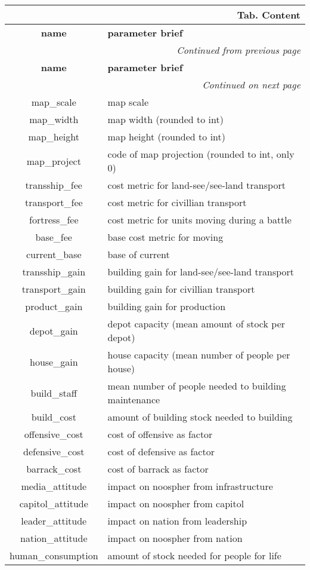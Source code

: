 \documentclass[a4paper,oneside,titlepage]{report}
\newcommand*{\LTHeaderII}[3]{
  \multicolumn{2}{r}{\textbf{Tab. \thesubsection} \textbf{#1}}\\    
  \hline
  \textbf{#2} & \textbf{#3}\\
  \hline

  \endfirsthead
  \multicolumn{2}{r}{\textit{Continued from previous page}}\\    
  \hline
  \textbf{#2} & \textbf{#3}\\
  \hline
  \endhead
  \hline
  \multicolumn{2}{r}{\textit{Continued on next page}}\\
  \endfoot
  \hline
  \endlastfoot  
}
\begin{document}
  \vspace{-0.5cm}
  \begin{longtable}{ |c|l| } 
    \LTHeaderII{Content}{name}{parameter brief}                    
    map\_scale  & map scale\\
    map\_width  & map width (rounded to int)\\
    map\_height  & map height (rounded to int)\\
    map\_project  & code of map projection (rounded to int, only 0)\\
    \hline
    transship\_fee  & cost metric for land-see$/$see-land transport\\
    transport\_fee  & cost metric for civillian transport\\
    fortress\_fee  & cost metric for units moving during a battle\\      
    base\_fee  & base cost metric for moving\\      
    current\_base  & base of current\\      
    \hline
    transship\_gain  & building gain for land-see$/$see-land transport\\
    transport\_gain  & building gain for civillian transport\\
    product\_gain  & building gain for production\\
    depot\_gain  & depot capacity (mean amount of stock per depot)\\      
    house\_gain  & house capacity (mean number of people per house)\\      
    \hline
    build\_staff & mean number of people needed to building maintenance\\      
    build\_cost & amount of building stock needed to building\\      
    \hline
    offensive\_cost & cost of offensive as factor\\      
    defensive\_cost & cost of defensive as factor\\      
    barrack\_cost  & cost of barrack as factor\\      
    \hline
    media\_attitude & impact on noospher from infrastructure\\      
    capitol\_attitude & impact on noospher from capitol\\      
    leader\_attitude & impact on nation from leadership\\      
    nation\_attitude & impact on noospher from nation\\      
    \hline
    human\_consumption & amount of stock needed for people for life\\      

\end{longtable}
\end{document}

